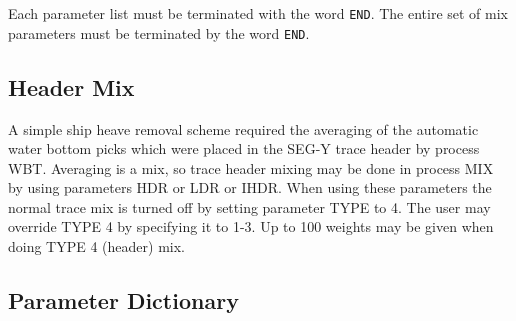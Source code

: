 Each parameter list must be terminated with the word \texttt{END}.  The entire
set of mix parameters must be terminated by the word \texttt{END}.

\subsection{Header Mix}

A simple ship heave removal scheme required the averaging of the automatic
water bottom picks which were placed in the SEG-Y trace header by process
WBT.  Averaging is a mix, so trace header mixing may be done in process
MIX by using parameters HDR or LDR or IHDR.  When using these parameters
the normal trace mix is turned off by setting parameter TYPE to 4.  The
user may override TYPE 4 by specifying it to 1-3.  Up to 100 weights may
be given when doing TYPE 4 (header) mix.

\subsection{Parameter Dictionary}

